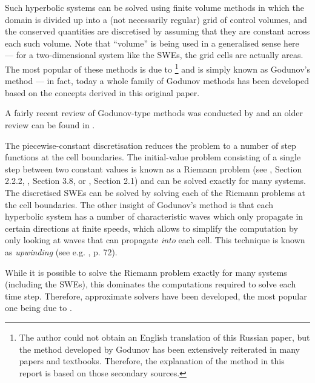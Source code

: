 Such hyperbolic systems can be solved using finite volume methods in which the domain is divided up into a (not necessarily regular) grid of control volumes, and the conserved quantities are discretised by assuming that they are constant across each such volume. Note that ``volume'' is being used in a generalised sense here --- for a two-dimensional system like the SWEs, the grid cells are actually areas. The most popular of these methods is due to \citet{godunov1959difference}\footnote{The author could not obtain an English translation of this Russian paper, but the method developed by Godunov has been extensively reiterated in many papers and textbooks. Therefore, the explanation of the method in this report is based on those secondary sources.} and is simply known as Godunov's method --- in fact, today a whole family of Godunov methods has been developed based on the concepts derived in this original paper.

A fairly recent review of Godunov-type methods was conducted by \citet{toro2007godunov} and an older review can be found in \citet{sweby2001godunov}.

The piecewise-constant discretisation reduces the problem to a number of step functions at the cell boundaries. The initial-value problem consisting of a single step between two constant values is known as a Riemann problem (see \citet{toro1999riemann}, Section 2.2.2, \citet{leveque2002finite}, Section 3.8, or \citet{toro2007godunov}, Section 2.1) and can be solved exactly for many systems. The discretised SWEs can be solved by solving each of the Riemann problems at the cell boundaries. The other insight of Godunov's method is that each hyperbolic system has a number of characteristic waves which only propagate in certain directions at finite speeds, which allows to simplify the computation by only looking at waves that can propagate \emph{into} each cell. This technique is known as \emph{upwinding} (see e.g. \citet{leveque2002finite}, p. 72).

While it is possible to solve the Riemann problem exactly for many systems (including the SWEs), this dominates the computations required to solve each time step. Therefore, approximate solvers have been developed, the most popular one being due to \citet{roe1981approximate}.


